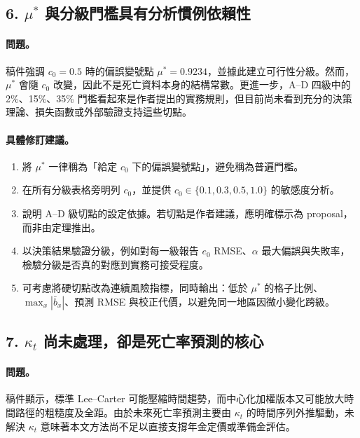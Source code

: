 \documentclass[12pt,a4paper]{article}
\begin{document}
\subsection*{6. $\mu^*$ 與分級門檻具有分析慣例依賴性}

\paragraph{問題。}
稿件強調 $c_0=0.5$ 時的偏誤變號點 $\mu^*=0.9234$，並據此建立可行性分級。然而，$\mu^*$ 會隨 $c_0$ 改變，因此不是死亡資料本身的結構常數。更進一步，A--D 四級中的 2\%、15\%、35\% 門檻看起來是作者提出的實務規則，但目前尚未看到充分的決策理論、損失函數或外部驗證支持這些切點。

\paragraph{具體修訂建議。}
\begin{enumerate}
  \item 將 $\mu^*$ 一律稱為「給定 $c_0$ 下的偏誤變號點」，避免稱為普遍門檻。
  \item 在所有分級表格旁明列 $c_0$，並提供 $c_0\in\{0.1,0.3,0.5,1.0\}$ 的敏感度分析。
  \item 說明 A--D 級切點的設定依據。若切點是作者建議，應明確標示為 proposal，而非由定理推出。
  \item 以決策結果驗證分級，例如對每一級報告 $e_0$ RMSE、$\alpha$ 最大偏誤與失敗率，檢驗分級是否真的對應到實務可接受程度。
  \item 可考慮將硬切點改為連續風險指標，同時輸出：低於 $\mu^*$ 的格子比例、$\max_x|\bar b_x|$、預測 RMSE 與校正代價，以避免同一地區因微小變化跨級。
\end{enumerate}

\subsection*{7. $\kappa_t$ 尚未處理，卻是死亡率預測的核心}

\paragraph{問題。}
稿件顯示，標準 Lee--Carter 可能壓縮時間趨勢，而中心化加權版本又可能放大時間路徑的粗糙度及全距。由於未來死亡率預測主要由 $\kappa_t$ 的時間序列外推驅動，未解決 $\kappa_t$ 意味著本文方法尚不足以直接支撐年金定價或準備金評估。
\end{document}
